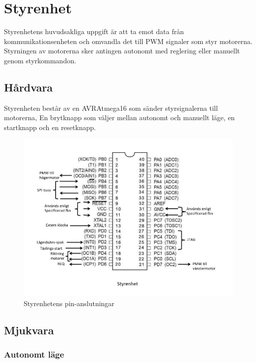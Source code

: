 \section{Styrenhet}

Styrenhetens huvudsakliga uppgift är att ta emot data från
kommunikationsenheten och omvandla det till PWM signaler som styr motorerna.
Styrningen av motorerna sker antingen autonomt med reglering eller 
manuellt genom styrkommandon.

\subsection{Hårdvara}

Styrenheten består av en AVRAtmega16 som sänder styrsignalerna till motorerna, 
En brytknapp som väljer mellan autonomt och manuellt läge, en startknapp och en 
resetknapp.  

\begin{figure}[H]
  \centering
 \includegraphics[angle=0,scale=0.5]{bilder/PIN_styr.jpg}
  \caption{Styrenhetens pin-anslutningar}
  \label{fig:PINstyr}
\end{figure}


\subsection{Mjukvara}

\subsubsection{Autonomt läge}

